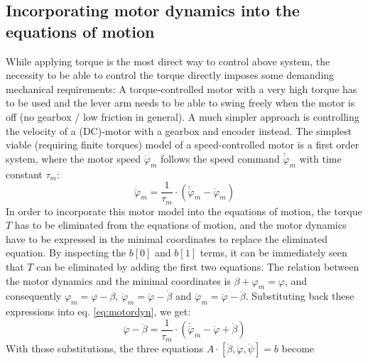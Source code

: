\documentclass{article}
\begin{document}
\subsection{Incorporating motor dynamics into the equations of motion}
\label{ss:EoM}
While applying torque is the most direct way to control above system, the necessity to be able to control the torque directly imposes some demanding mechanical requirements:
A torque-controlled motor with a very high torque has to be used and the lever arm needs to be able to swing freely when the motor is off (no gearbox / low friction in general).
A much simpler approach is controlling the velocity of a (DC)-motor with a gearbox and encoder instead. The simplest viable (requiring finite torques) model of a speed-controlled motor is a first order system, where the motor speed $\dot{\varphi}_m$ follows the speed command $\breve{\dot{\varphi}}_m$ with time constant $\tau_m$:
\begin{equation}
\ddot{\varphi}_m = \frac{1}{\tau_m} \cdot \left(\breve{\dot{\varphi}}_m - \dot{\varphi}_m \right)
\label{eq:motordyn}
\end{equation} 
In order to incorporate this motor model into the equations of motion, the torque $T$ has to be eliminated from the equations of motion, and the motor dynamics have to be expressed in the minimal coordinates to replace the eliminated equation.
By inspecting the $b[0]$ and $b[1]$ terms, it can be immediately seen that $T$ can be eliminated by adding the first two equations. 
The relation between the motor dynamics and the minimal coordinates is $\beta + \varphi_m = \varphi$, and consequently $\varphi_m = \varphi - \beta$, $\dot{\varphi}_m = \dot{\varphi} - \dot{\beta}$ and $\ddot{\varphi}_m = \ddot{\varphi} - \ddot{\beta}$.
Substituting back these expressions into eq. \ref{eq:motordyn}, we get:
\begin{equation}
\ddot{\varphi} - \ddot{\beta} = \frac{1}{\tau_m} \cdot \left(\breve{\dot{\varphi}}_m - \dot{\varphi} + \dot{\beta} \right)
\end{equation}
With those substitutions, the three equations $A \cdot [\ddot{\beta}, \ddot{\varphi}, \ddot{\psi}] = b$ become
\end{document}
